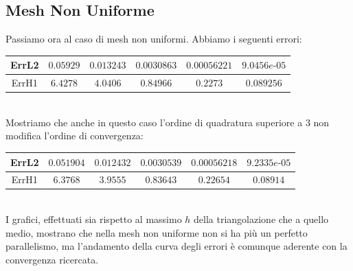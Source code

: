 \documentclass[12pt,a4paper]{report}
\theoremstyle{theorem}
\theoremstyle{theorem}
\theoremstyle{definition}
\begin{document}
\subsection{Mesh Non Uniforme}
Passiamo ora al caso di mesh non uniformi. Abbiamo i seguenti errori: \\
\begin{table}[!h]
\centering
\begin{tabular}{ | c | c | c | c | c | c | }
\hline
ErrL2	&	$0.05929$ &	$0.013243$	 & $0.0030863$	 & $0.00056221$ & $9.0456e\text{-}05$ \\ \hline 
ErrH1	&	$6.4278$ &	$4.0406$	 & $0.84966$	 & $0.2273    $ & $0.089256$ \\ \hline
\end{tabular}
\end{table}
\hfill \\
Mostriamo che anche in questo caso l'ordine di quadratura superiore a $3$ non modifica l'ordine di convergenza:
\begin{table}[!h]
\centering
\begin{tabular}{ | c | c | c | c | c | c | }
\hline
ErrL2	&	$0.051904$ & $0.012432$ & $0.0030539$ & $0.00056218$  & $9.2335e\text{-}05$ \\ \hline 
ErrH1	&	$6.3768$ &	$3.9555$	 & $0.83643$	 & $0.22654$ & $0.08914$ \\ \hline 
\end{tabular}
\end{table}
\hfill \\
I grafici, effettuati sia rispetto al massimo $h$ della triangolazione che a quello medio, mostrano che nella mesh non uniforme non si ha più un perfetto parallelismo, ma l'andamento della curva degli errori è comunque aderente con la convergenza ricercata.
\end{document}
